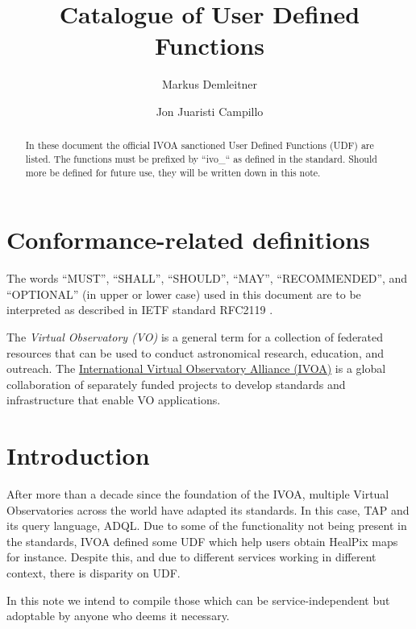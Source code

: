 \documentclass[11pt,a4paper]{ivoa}
\title{Catalogue of User Defined Functions}
\author{Markus Demleitner}
\author{Jon Juaristi Campillo}
\begin{document}
\begin{abstract}
In these document the official IVOA sanctioned User Defined Functions
(UDF) are listed. The functions must be prefixed by ``ivo\_`` as
defined in the standard. Should more be defined for future use, they
will be written down in this note.
\end{abstract}




\section*{Conformance-related definitions}

The words ``MUST'', ``SHALL'', ``SHOULD'', ``MAY'', ``RECOMMENDED'', and
``OPTIONAL'' (in upper or lower case) used in this document are to be
interpreted as described in IETF standard RFC2119 \citep{std:RFC2119}.

The \emph{Virtual Observatory (VO)} is a
general term for a collection of federated resources that can be used
to conduct astronomical research, education, and outreach.
The \href{http://www.ivoa.net}{International
Virtual Observatory Alliance (IVOA)} is a global
collaboration of separately funded projects to develop standards and
infrastructure that enable VO applications.


\section{Introduction}

After more than a decade since the foundation of the IVOA, multiple
Virtual Observatories across the world have adapted its standards. In
this case, TAP and its query language, ADQL. Due to some of the
functionality not being present in the standards, IVOA defined some UDF
which help users obtain HealPix maps for instance. Despite this, and due
to different services working in different context, there is disparity
on UDF.

In this note we intend to compile those which can be service-independent
but adoptable by anyone who deems it necessary.

\end{document}
